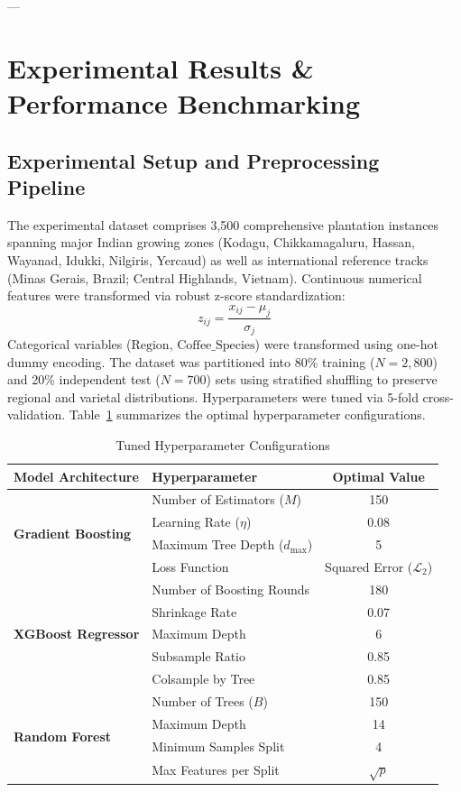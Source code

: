 \documentclass[conference]{IEEEtran}
\begin{document}
---

\section{Experimental Results \& Performance Benchmarking}

\subsection{Experimental Setup and Preprocessing Pipeline}
The experimental dataset comprises 3,500 comprehensive plantation instances spanning major Indian growing zones (Kodagu, Chikkamagaluru, Hassan, Wayanad, Idukki, Nilgiris, Yercaud) as well as international reference tracks (Minas Gerais, Brazil; Central Highlands, Vietnam). Continuous numerical features were transformed via robust z-score standardization:
\begin{equation}
z_{ij} = \frac{x_{ij} - \mu_j}{\sigma_j}
\end{equation}
Categorical variables ($\text{Region}$, $\text{Coffee\_Species}$) were transformed using one-hot dummy encoding. The dataset was partitioned into 80\% training ($N = 2,800$) and 20\% independent test ($N = 700$) sets using stratified shuffling to preserve regional and varietal distributions. Hyperparameters were tuned via 5-fold cross-validation. Table~\ref{tab:hyperparams} summarizes the optimal hyperparameter configurations.

\begin{table}[htbp]
\caption{Tuned Hyperparameter Configurations}
\begin{center}
\begin{tabular}{llc}
\toprule
\textbf{Model Architecture} & \textbf{Hyperparameter} & \textbf{Optimal Value} \\
\midrule
\multirow{4}{*}{\textbf{Gradient Boosting}} & Number of Estimators ($M$) & 150 \\
 & Learning Rate ($\eta$) & 0.08 \\
 & Maximum Tree Depth ($d_{\text{max}}$) & 5 \\
 & Loss Function & Squared Error ($\mathcal{L}_2$) \\
\midrule
\multirow{5}{*}{\textbf{XGBoost Regressor}} & Number of Boosting Rounds & 180 \\
 & Shrinkage Rate & 0.07 \\
 & Maximum Depth & 6 \\
 & Subsample Ratio & 0.85 \\
 & Colsample by Tree & 0.85 \\
\midrule
\multirow{4}{*}{\textbf{Random Forest}} & Number of Trees ($B$) & 150 \\
 & Maximum Depth & 14 \\
 & Minimum Samples Split & 4 \\
 & Max Features per Split & $\sqrt{p}$ \\
\bottomrule
\end{tabular}
\label{tab:hyperparams}
\end{center}
\end{table}
\end{document}
